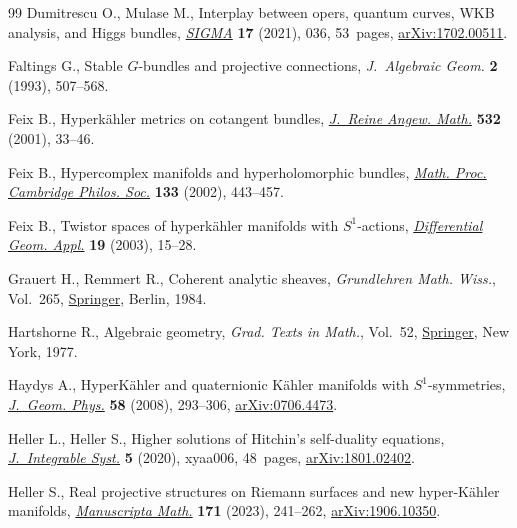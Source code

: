 \documentclass[pdftex]{sigma}
\numberwithin{equation}{section}
\theoremstyle{definition}
\begin{document}
\begin{thebibliography}{99}
Dumitrescu O., Mulase M., Interplay between opers, quantum curves, {WKB}
 analysis, and {H}iggs bundles,
 \href{https://doi.org/10.3842/SIGMA.2021.036}{\textit{SIGMA}} \textbf{17}
 (2021), 036, 53~pages,
 \href{http://arxiv.org/abs/1702.00511}{arXiv:1702.00511}.

Faltings G., Stable {$G$}-bundles and projective connections,
 \textit{J.~Algebraic Geom.} \textbf{2} (1993), 507--568.

Feix B., Hyperk\"ahler metrics on cotangent bundles,
 \href{https://doi.org/10.1515/crll.2001.017}{\textit{J.~Reine Angew. Math.}}
 \textbf{532} (2001), 33--46.

Feix B., Hypercomplex manifolds and hyperholomorphic bundles,
 \href{https://doi.org/10.1017/S0305004102006114}{\textit{Math. Proc.
 Cambridge Philos. Soc.}} \textbf{133} (2002), 443--457.

Feix B., Twistor spaces of hyperk\"ahler manifolds with {$S^1$}-actions,
 \href{https://doi.org/10.1016/S0926-2245(03)00013-5}{\textit{Differential
 Geom. Appl.}} \textbf{19} (2003), 15--28.

Grauert H., Remmert R., Coherent analytic sheaves, \textit{Grundlehren Math.
 Wiss.}, Vol.~265, \href{https://doi.org/10.1007/978-3-642-69582-7}{Springer},
 Berlin, 1984.

Hartshorne R., Algebraic geometry, \textit{Grad. Texts in Math.}, Vol.~52,
 \href{https://doi.org/10.1007/978-1-4757-3849-0}{Springer}, New York, 1977.

Haydys A., Hyper{K}\"ahler and quaternionic {K}\"ahler manifolds with
 {$S^1$}-symmetries,
 \href{https://doi.org/10.1016/j.geomphys.2007.11.004}{\textit{J.~Geom.
 Phys.}} \textbf{58} (2008), 293--306,
 \href{http://arxiv.org/abs/0706.4473}{arXiv:0706.4473}.

Heller L., Heller S., Higher solutions of Hitchin's self-duality equations,
 \href{https://doi.org/10.1093/integr/xyaa006}{\textit{J.~Integrable Syst.}}
 \textbf{5} (2020), xyaa006, 48~pages,
 \href{http://arxiv.org/abs/1801.02402}{arXiv:1801.02402}.

Heller S., Real projective structures on {R}iemann surfaces and new
 hyper-{K}\"ahler manifolds,
 \href{https://doi.org/10.48550/arXiv.1906.10350}{\textit{Manuscripta Math.}}
 \textbf{171} (2023), 241--262,
 \href{http://arxiv.org/abs/1906.10350}{arXiv:1906.10350}.


\end{thebibliography}
\end{document}
